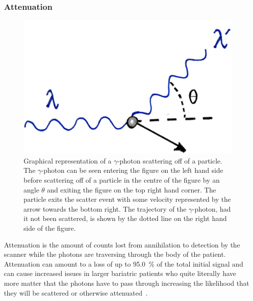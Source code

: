             \subsubsection{Attenuation} \label{sec:attenuation}
                \begin{figure}
                    \centering
                    
                    \includegraphics[width=1.0\linewidth]{figures/background_scatter.png}
                    
                    \captionsetup{singlelinecheck=false, justification=raggedright}
                    \caption{Graphical representation of a $\gamma$-photon scattering off of a particle. The $\gamma$-photon can be seen entering the figure on the left hand side before scattering off of a particle in the centre of the figure by an angle $\theta$ and exiting the figure on the top right hand corner. The particle exits the scatter event with some velocity represented by the arrow towards the bottom right. The trajectory of the $\gamma$-photon, had it not been scattered, is shown by the dotted line on the right hand side of the figure.} \label{fig:attenuation_scatter}
                \end{figure}
                
                Attenuation is the amount of counts lost from annihilation to detection by the scanner while the photons are traversing through the body of the patient. Attenuation can amount to a loss of up to \SI{95.0}{\percent} of the total initial signal and can cause increased issues in larger bariatric patients who quite literally have more matter that the photons have to pass through increasing the likelihood that they will be scattered or otherwise attenuated~.
                
